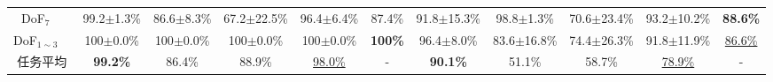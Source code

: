 \begin{table}[htbp]
\begin{adjustbox}{max width=\textwidth,center}
\begin{tabular}{c|c|cccccccccc}
\multicolumn{1}{c|}{DoF$_7$}              &                                     & 99.2$\pm$1.3\%                          & 86.6$\pm$8.3\%                           & 67.2$\pm$22.5\%                       & 96.4$\pm$6.4\%                        & \multicolumn{1}{c|}{\cellcolor{mygray}87.4\%}                & 91.8$\pm$15.3\%                            & 98.8$\pm$1.3\%                             & 70.6$\pm$23.4\%                         & 93.2$\pm$10.2\%                         & \cellcolor{mygray} \textbf{88.6\%}                        \\
\multicolumn{1}{c|}{\quad DoF$_{1\sim3}$} &                                     & 100$\pm$0.0\%                           & 100$\pm$0.0\%                           & 100$\pm$0.0\%                         & 100$\pm$0.0\%                         & \multicolumn{1}{c|}{\cellcolor{mygray}\textbf{100\%}}        & 96.4$\pm$8.0\%                             & 83.6$\pm$16.8\%                            & 74.4$\pm$26.3\%                         & 91.8$\pm$11.9\%                         & \cellcolor{mygray} \underline{86.6\%}                        \\
\midrule
\multicolumn{2}{c|}{任务平均}                                                    & \cellcolor{mygray} \textbf{99.2\%}                 & \cellcolor{mygray} 86.4\%                 & \cellcolor{mygray} 88.9\%               & \cellcolor{mygray} \underline{98.0\%}               & \multicolumn{1}{c|}{-}         & \cellcolor{mygray} \textbf{90.1\%}                  & \cellcolor{mygray} 51.1\%                 & \cellcolor{mygray} 58.7\%               & \cellcolor{mygray} \underline{78.9\%}               & -                                                \\
\bottomrule
    \end{tabular}
    \label{tab:main-result-NTA}
    \end{adjustbox}
    \vspace{-15pt}
\end{table}

